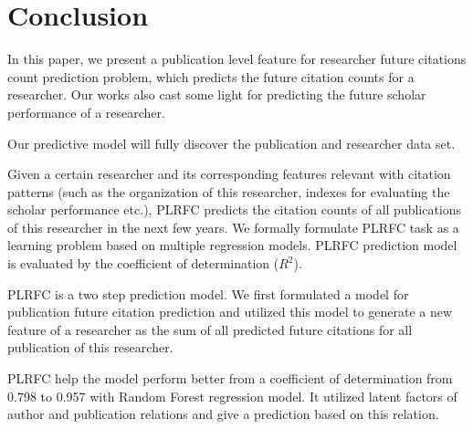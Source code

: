 \section{Conclusion}
In this paper, we present a publication level feature for researcher future citations count prediction problem, which predicts the future citation counts for a researcher. 
Our works also cast some light for predicting the future scholar performance of a researcher.

Our predictive model will fully discover the publication and researcher data set. 

Given a certain researcher and its corresponding features relevant with citation patterns (such as the organization of this researcher, indexes for evaluating the scholar performance etc.), PLRFC predicts the citation counts of all publications of this researcher in the next few years. We formally formulate PLRFC task as a learning problem based on multiple regression models. PLRFC prediction model is evaluated by the coefficient of determination ($R^2$).

PLRFC is a two step prediction model. We first formulated a model for publication future citation prediction and utilized this model to generate a new feature of a researcher as the sum of all predicted future citations for all publication of this researcher. 

PLRFC help the model perform better from a coefficient of determination from 0.798 to 0.957 with Random Forest regression model. It utilized latent factors of author and publication relations and give a prediction based on this relation.